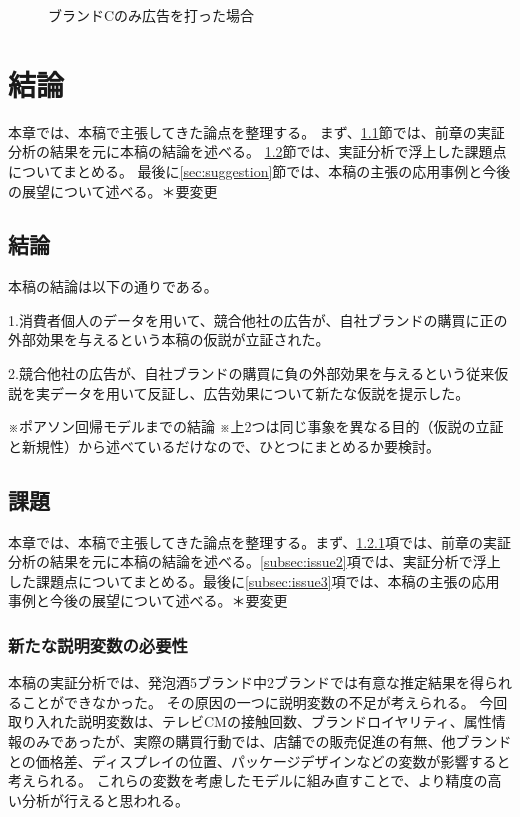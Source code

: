 \documentclass[11pt]{jsarticle}
\begin{document}
\begin{figure}[htbp]
\begin{minipage}{0.5\columnwidth}
  \caption{ブランドCのみ広告を打った場合}
  \label{fig:3-4-3_c_ad}
 \end{minipage}
\end{figure}

\section{結論}
\label{ch:conclusion}
本章では、本稿で主張してきた論点を整理する。
まず、\ref{sec:conclusion}節では、前章の実証分析の結果を元に本稿の結論を述べる。
\ref{sec:issue}節では、実証分析で浮上した課題点についてまとめる。
最後に\ref{sec:suggestion}節では、本稿の主張の応用事例と今後の展望について述べる。＊要変更

\subsection{結論}
\label{sec:conclusion}
本稿の結論は以下の通りである。

1.消費者個人のデータを用いて、競合他社の広告が、自社ブランドの購買に正の外部効果を与えるという本稿の仮説が立証された。

2.競合他社の広告が、自社ブランドの購買に負の外部効果を与えるという従来仮説を実データを用いて反証し、広告効果について新たな仮説を提示した。


※ポアソン回帰モデルまでの結論
※上2つは同じ事象を異なる目的（仮説の立証と新規性）から述べているだけなので、ひとつにまとめるか要検討。

\subsection{課題}
\label{sec:issue}
本章では、本稿で主張してきた論点を整理する。まず、\ref{subsec:issue1}項では、前章の実証分析の結果を元に本稿の結論を述べる。\ref{subsec:issue2}項では、実証分析で浮上した課題点についてまとめる。最後に\ref{subsec:issue3}項では、本稿の主張の応用事例と今後の展望について述べる。＊要変更

\subsubsection{新たな説明変数の必要性}
\label{subsec:issue1}
本稿の実証分析では、発泡酒5ブランド中2ブランドでは有意な推定結果を得られることができなかった。
その原因の一つに説明変数の不足が考えられる。
今回取り入れた説明変数は、テレビCMの接触回数、ブランドロイヤリティ、属性情報のみであったが、実際の購買行動では、店舗での販売促進の有無、他ブランドとの価格差、ディスプレイの位置、パッケージデザインなどの変数が影響すると考えられる。
これらの変数を考慮したモデルに組み直すことで、より精度の高い分析が行えると思われる。
\end{document}
